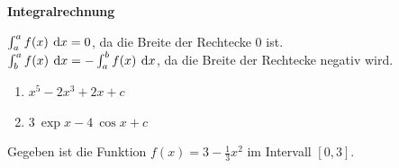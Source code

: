 \documentclass[11pt]{exam}
\newcommand{\theme}{Integralrechnung}
\begin{document}
\fontsize{14}{14}\selectfont
\begin{center}
    \huge\bf\theme
\end{center}

\begin{questions}
\noaddpoints
\question[\totalpoints]
\addpoints
{}
\begin{solution}
	$\int_a^a f(x)\:\operatorname{d}\!{x} = 0$, da die Breite der Rechtecke $0$ ist.\\
	$\int_b^a f(x)\:\operatorname{d}\!{x} = -\int_a^b f(x)\:\operatorname{d}\!{x}$, da die Breite der Rechtecke negativ wird.
\end{solution}
\begin{solution}
	\begin{enumerate}[label=\roman*)]
		\item $x^5 - 2x^3 + 2x + c$
		\item $3\:\exp{x} - 4\:\cos{x} + c$
	\end{enumerate}
\end{solution}


\noaddpoints
\question[\totalpoints]
\addpoints
Gegeben ist die Funktion $f(x) = 3 - \frac{1}{3}x^2$ im Intervall $[0,3]$.
\begin{parts}

\end{parts}
\end{questions}
\end{document}
